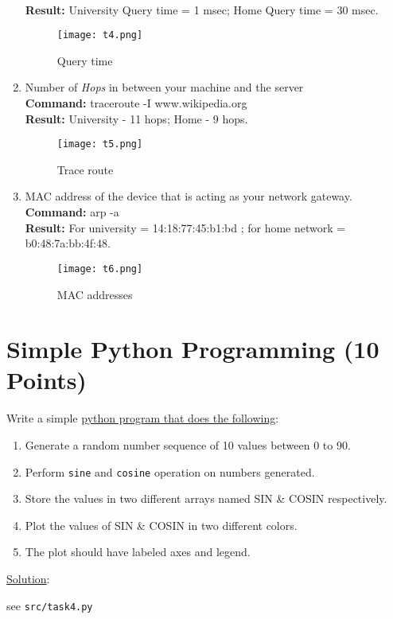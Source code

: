 \documentclass{WeSTassignment}
\begin{document}
\begin{enumerate}
\\
\textbf{Result:} University Query time = 1 msec; Home Query time = 30 msec.
\begin{figure}[h]
  \centering
  \texttt{[image: t4.png]}
     \caption{Query time}
     \label{fig:t4}
\end{figure}
\item Number of \emph{Hops} in between your machine and the server
\\
\textbf{Command:} traceroute -I www.wikipedia.org
\\
\textbf{Result:} University - 11 hops; Home - 9 hops. 
\begin{figure}[h]
  \centering
  \texttt{[image: t5.png]}
     \caption{Trace route}
     \label{fig:t5}
\end{figure}
\item MAC address of the device that is acting as your network gateway. 
\\
\textbf{Command:} arp -a
\\
\textbf{Result:} For university = 14:18:77:45:b1:bd ; for home network = b0:48:7a:bb:4f:48. 
\begin{figure}[h]
  \centering
  \texttt{[image: t6.png]}
     \caption{MAC addresses}
     \label{fig:t6}
\end{figure}
\end{enumerate}

\section{Simple Python Programming (10 Points)}

Write a simple \underline{python program that does the following}:
\begin{enumerate}
\item Generate a random number sequence of 10 values between 0 to 90. 
\item Perform \texttt{sine} and \texttt{cosine} operation on numbers generated. 
\item Store the values in two different arrays named SIN \& COSIN respectively. 
\item Plot the values of SIN \& COSIN in two different colors. 
\item The plot should have labeled axes and legend.
\end{enumerate}

\underline{Solution}: 

see \texttt{src/task4.py}
\end{document}
